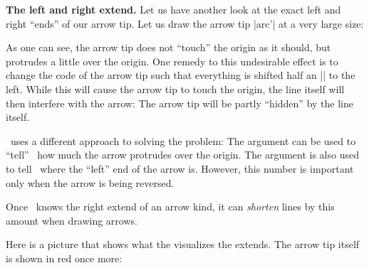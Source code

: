 \begin{command}{\pgfarrowsdeclare{}}
  \textbf{The left and right extend.}
  Let us have another look at the exact left and right ``ends'' of our
  arrow tip. Let us draw the arrow tip |arc'| at a very large size:

\begin{codeexample}[]
\end{codeexample}

  As one can see, the arrow tip does not ``touch'' the origin as it
  should, but protrudes a little over the origin. One remedy to this
  undesirable effect is to change the code of the arrow tip such that
  everything is shifted half an |\arrowsize| to the left. While this
  will cause the arrow tip to touch the origin, the line itself will
  then interfere with the arrow: The arrow tip will be partly
  ``hidden'' by the line itself.

  \pgfname\ uses a different approach to solving the problem: The
   argument can be used to ``tell'' \pgfname\ how
  much the arrow protrudes over the origin. The argument is also used
  to tell \pgfname\ where the ``left'' end of the arrow is. However,
  this number is important only when the arrow is being reversed.

  Once \pgfname\ knows the right extend of an arrow kind, it can
  \emph{shorten} lines by this amount when drawing arrows.

  Here is a picture that shows what the visualizes the extends. The
  arrow tip itself is shown in red once more:

  \medskip
  


\end{command}
